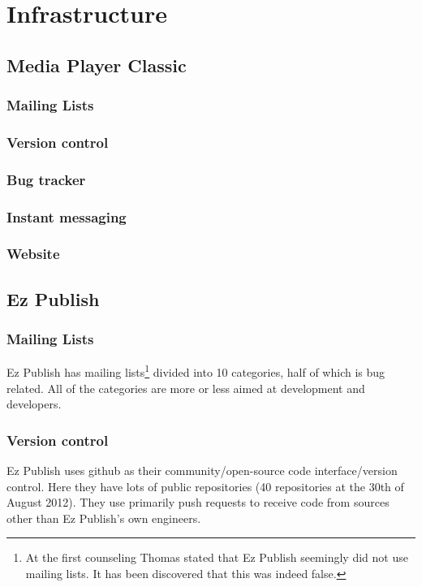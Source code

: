 \documentclass{report} %
\begin{document}
\section{Infrastructure}
\subsection{Media Player Classic}
\subsubsection{Mailing Lists}
\subsubsection{Version control}
\subsubsection{Bug tracker}
\subsubsection{Instant messaging}
\subsubsection{Website}

\subsection{Ez Publish}
\subsubsection{Mailing Lists}
Ez Publish has mailing lists\cite{ezpubwebmaillists}\footnote{At the first counseling Thomas stated that Ez Publish seemingly did not use mailing lists. It has been discovered that this was indeed false.} divided into 10 categories, half of which is bug related. All of the categories are more or less aimed at development and developers.
\subsubsection{Version control}
Ez Publish uses github\cite{ezpubgithub} as their community/open-source code interface/version control. Here they have lots of public repositories (40 repositories at the 30th of August 2012). They use primarily push requests to receive code from sources other than Ez Publish's own engineers. %
\end{document}
